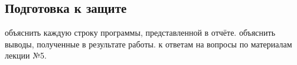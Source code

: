 { %
	\subsection{Подготовка к защите}
	\begin{enumerate}
		 объяснить каждую строку программы, представленной в отчёте. 
		 объяснить выводы, полученные в результате работы.
		 к ответам на вопросы по материалам лекции №5.
	\end{enumerate}
}
